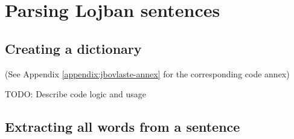 \chapter{Parsing Lojban sentences}

\section{Creating a dictionary}
\label{sec:creating_a_dictionary}

(See Appendix \ref{appendix:jbovlaste-annex} for the corresponding code annex)

TODO: Describe code logic and usage

\section{Extracting all words from a sentence}

